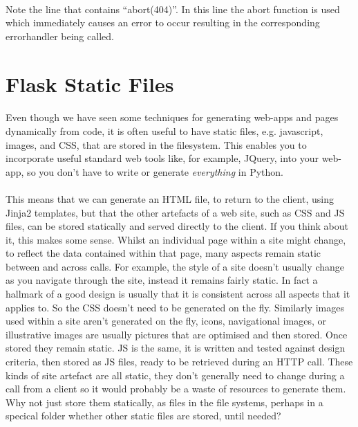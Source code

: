 \documentclass[12pt, a4paper, oneside]{book}
\begin{document}
\paragraph{} Note the line that contains ``abort(404)''. In this line the abort function is used which immediately causes an error to occur resulting in the corresponding errorhandler being called.

\section{Flask Static Files}
\label{static}
\paragraph{} Even though we have seen some techniques for generating web-apps and pages dynamically from code, it is often useful to have static files, e.g. javascript, images, and CSS, that are stored in the filesystem. This enables you to incorporate useful standard web tools like, for example, JQuery, into your web-app, so you don't have to write or generate \emph{everything} in Python. 

\paragraph{} This means that we can generate an HTML file, to return to the client, using Jinja2 templates, but that the other artefacts of a web site, such as CSS and JS files, can be stored statically and served directly to the client. If you think about it, this makes some sense. Whilst an individual page within a site might change, to reflect the data contained within that page, many aspects remain static between and across calls. For example, the style of a site doesn't usually change as you navigate through the site, instead it remains fairly static. In fact a hallmark of a good design is usually that it is consistent across all aspects that it applies to. So the CSS doesn't need to be generated on the fly. Similarly images used within a site aren't generated on the fly, icons, navigational images, or illustrative images are usually pictures that are optimised and then stored. Once stored they remain static. JS is the same, it is written and tested against design criteria, then stored as JS files, ready to be retrieved during an HTTP call. These kinds of site artefact are all static, they don't generally need to change during a call from a client so it would probably be a waste of resources to generate them. Why not just store them statically, as files in the file systems, perhaps in a specical folder whether other static files are stored, until needed?
\end{document}
